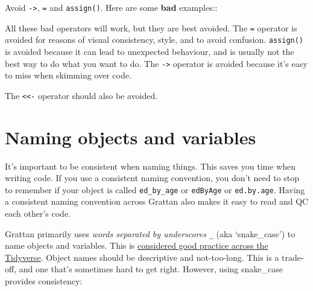 \documentclass[]{book}
\newenvironment{Shaded}{\begin{snugshade}}{\end{snugshade}}
\newcommand{\KeywordTok}[1]{\textcolor[rgb]{0.13,0.29,0.53}{\textbf{#1}}}
\newcommand{\NormalTok}[1]{#1}
\newcommand{\OperatorTok}[1]{\textcolor[rgb]{0.81,0.36,0.00}{\textbf{#1}}}
\newcommand{\StringTok}[1]{\textcolor[rgb]{0.31,0.60,0.02}{#1}}
\begin{document}
Avoid \texttt{-\textgreater{}}, \texttt{=} and \texttt{assign()}. Here are some \textbf{bad} examples::

\begin{Shaded}
\end{Shaded}

All these bad operators will work, but they are best avoided. The \texttt{=} operator is avoided for reasons of visual consistency, style, and to avoid confusion. \texttt{assign()} is avoided because it can lead to unexpected behaviour, and is usually not the best way to do what you want to do. The \texttt{-\textgreater{}} operator is avoided because it's easy to miss when skimming over code.

The \texttt{\textless{}\textless{}-} operator should also be avoided.

\hypertarget{naming-objects-and-variables}{%
\section{Naming objects and variables}\label{naming-objects-and-variables}}

It's important to be consistent when naming things. This saves you time when writing code. If you use a consistent naming convention, you don't need to stop to remember if your object is called \texttt{ed\_by\_age} or \texttt{edByAge} or \texttt{ed.by.age}. Having a consistent naming convention across Grattan also makes it easy to read and QC each other's code.

Grattan primarily uses \emph{words separated by underscores} \texttt{\_} (aka `snake\_case') to name objects and variables. This is \href{https://style.tidyverse.org/syntax.html\#object-names}{considered good practice across the Tidyverse}.
Object names should be descriptive and not-too-long. This is a trade-off, and one that's sometimes hard to get right. However, using snake\_case provides consistency:
\end{document}
